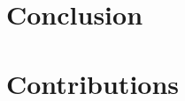 \documentclass{l3proj}
\begin{document}
\chapter{Conclusion}
\label{conc}

\chapter{Contributions}
\label{contribs}


\clearpage


\end{document}
